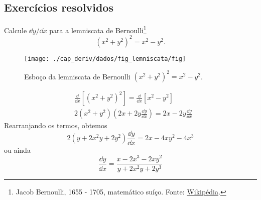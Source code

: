 \subsection{Exercícios resolvidos}

\begin{exeresol}
  Calcule $\dd y/\dd x$ para a lemniscata de Bernoulli\footnote{Jacob Bernoulli, 1655 - 1705, matemático suíço. Fonte: \href{https://pt.wikipedia.org/wiki/Jakob_Bernoulli}{Wikipédia}.}
  \begin{equation}
    (x^2 + y^2)^2 = x^2 - y^2.
  \end{equation}
  \begin{figure}[H]
    \centering
    \texttt{[image: ./cap\_deriv/dados/fig\_lemniscata/fig]}
    \caption{Esboço da lemniscata de Bernoulli $(x^2+y^2)^2 = x^2 - y^2$.}
    \label{fig:lemniscata}
  \end{figure}
\end{exeresol}
\begin{resol}
  \begin{align}
    & \frac{\dd}{\dd x}\left[(x^2 + y^2)^2\right] = \frac{\dd}{\dd x}\left[x^2 - y^2\right]\\
    & 2(x^2 + y^2)\left(2x + 2y\frac{\dd y}{\dd x}\right) = 2x - 2y\frac{\dd y}{\dd x}
  \end{align}
  Rearranjando os termos, obtemos
  \begin{equation}
    2(y + 2x^2y + 2y^2)\frac{\dd y}{\dd x} = 2x - 4xy^2 - 4x^3
  \end{equation}
  ou ainda
  \begin{equation}
    \frac{\dd y}{\dd x} = \frac{x - 2x^3 - 2xy^2}{y + 2x^2y + 2y^3}
  \end{equation}
\end{resol}


